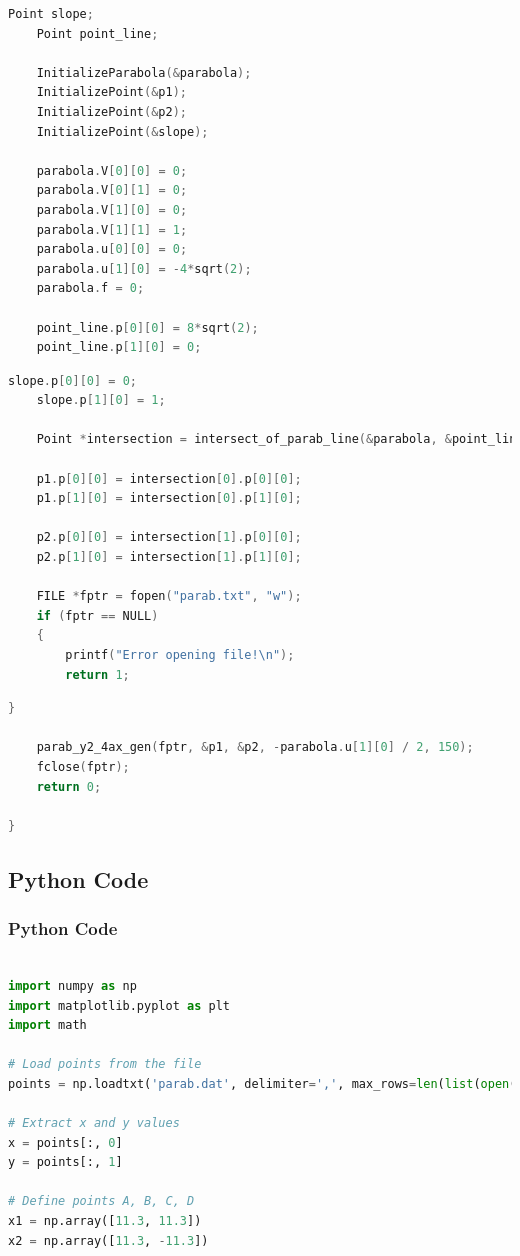 \documentclass{beamer}
\theoremstyle{remark}
\numberwithin{equation}{section}
\begin{document}
     \begin{frame}[fragile]
\begin{lstlisting}[language = C]
    Point slope;
    Point point_line;

    InitializeParabola(&parabola);
    InitializePoint(&p1);
    InitializePoint(&p2);
    InitializePoint(&slope);
    
    parabola.V[0][0] = 0;
    parabola.V[0][1] = 0;
    parabola.V[1][0] = 0;
    parabola.V[1][1] = 1;
    parabola.u[0][0] = 0;
    parabola.u[1][0] = -4*sqrt(2);
    parabola.f = 0;
    
    point_line.p[0][0] = 8*sqrt(2);
    point_line.p[1][0] = 0;
\end{lstlisting}
\end{frame}

 \begin{frame}[fragile]
\begin{lstlisting}[language = C]
    slope.p[0][0] = 0;
    slope.p[1][0] = 1;

    Point *intersection = intersect_of_parab_line(&parabola, &point_line, &slope);

    p1.p[0][0] = intersection[0].p[0][0];
    p1.p[1][0] = intersection[0].p[1][0];

    p2.p[0][0] = intersection[1].p[0][0];
    p2.p[1][0] = intersection[1].p[1][0];
    
    FILE *fptr = fopen("parab.txt", "w");
    if (fptr == NULL) 
    {
        printf("Error opening file!\n");
        return 1;
 \end{lstlisting}
    \end{frame}

 \begin{frame}[fragile]
\begin{lstlisting}[language = C]
}

    parab_y2_4ax_gen(fptr, &p1, &p2, -parabola.u[1][0] / 2, 150);
    fclose(fptr);
    return 0;

}

\end{lstlisting}
\end{frame}

\subsection{Python Code}
\begin{frame}[fragile]
\frametitle{Python Code}
\begin{lstlisting}[language = Python]

import numpy as np
import matplotlib.pyplot as plt
import math

# Load points from the file
points = np.loadtxt('parab.dat', delimiter=',', max_rows=len(list(open("./parab.dat")))-1)

# Extract x and y values
x = points[:, 0]
y = points[:, 1]

# Define points A, B, C, D
x1 = np.array([11.3, 11.3])
x2 = np.array([11.3, -11.3])

\end{lstlisting}
\end{frame}
\end{document}
